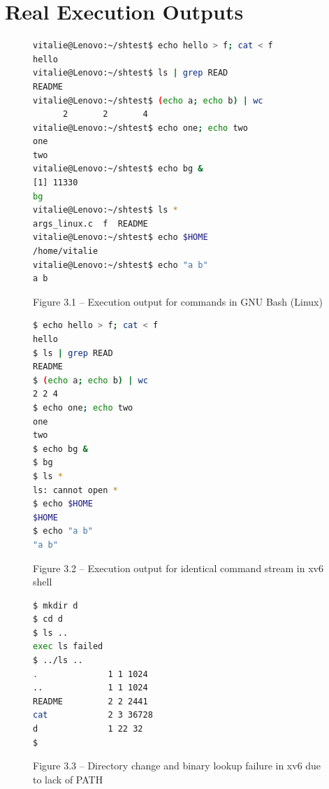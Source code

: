 \documentclass[12pt,a4paper]{report}
\numberwithin{equation}{chapter}
\numberwithin{figure}{chapter}
\numberwithin{table}{chapter}
\begin{document}
\section{Real Execution Outputs}

\begin{figure}[H]
\centering
\begin{lstlisting}[language=bash]
vitalie@Lenovo:~/shtest$ echo hello > f; cat < f
hello
vitalie@Lenovo:~/shtest$ ls | grep READ
README
vitalie@Lenovo:~/shtest$ (echo a; echo b) | wc
      2       2       4
vitalie@Lenovo:~/shtest$ echo one; echo two
one
two
vitalie@Lenovo:~/shtest$ echo bg &
[1] 11330
bg
vitalie@Lenovo:~/shtest$ ls *
args_linux.c  f  README
vitalie@Lenovo:~/shtest$ echo $HOME
/home/vitalie
vitalie@Lenovo:~/shtest$ echo "a b"
a b
\end{lstlisting}
\caption{Figure 3.1 -- Execution output for commands in GNU Bash (Linux)}
\end{figure}

\begin{figure}[H]
\centering
\begin{lstlisting}[language=bash]
$ echo hello > f; cat < f
hello
$ ls | grep READ
README
$ (echo a; echo b) | wc
2 2 4
$ echo one; echo two
one
two
$ echo bg &
$ bg
$ ls *
ls: cannot open *
$ echo $HOME
$HOME
$ echo "a b"
"a b"
\end{lstlisting}
\caption{Figure 3.2 -- Execution output for identical command stream in xv6 shell}
\end{figure}

\begin{figure}[H]
\centering
\begin{lstlisting}[language=bash]
$ mkdir d
$ cd d
$ ls ..
exec ls failed
$ ../ls ..
.              1 1 1024
..             1 1 1024
README         2 2 2441
cat            2 3 36728
d              1 22 32
$
\end{lstlisting}
\caption{Figure 3.3 -- Directory change and binary lookup failure in xv6 due to lack of PATH}
\end{figure}
\end{document}
